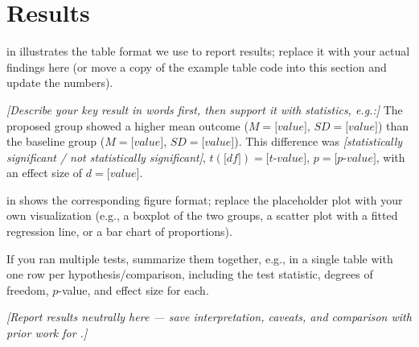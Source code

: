 \section{Results}
\label{S:results}


 in  illustrates the table format we use to report results; replace it with your actual findings here (or move a copy of the example table code into this section and update the numbers).

\textit{[Describe your key result in words first, then support it with statistics, e.g.:]} The proposed group showed a higher mean outcome ($M = \textit{[value]}$, $SD = \textit{[value]}$) than the baseline group ($M = \textit{[value]}$, $SD = \textit{[value]}$). This difference was \textit{[statistically significant / not statistically significant]}, $t(\textit{[df]}) = \textit{[t-value]}$, $p = \textit{[p-value]}$, with an effect size of $d = \textit{[value]}$.

 in  shows the corresponding figure format; replace the placeholder plot with your own visualization (e.g., a boxplot of the two groups, a scatter plot with a fitted regression line, or a bar chart of proportions).

If you ran multiple tests, summarize them together, e.g., in a single table with one row per hypothesis/comparison, including the test statistic, degrees of freedom, $p$-value, and effect size for each.

\textit{[Report results neutrally here — save interpretation, caveats, and comparison with prior work for .]}